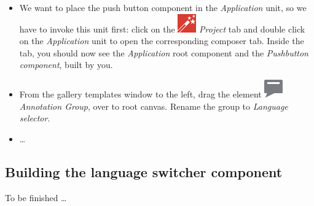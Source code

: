 \documentclass[
  a4paper,
,tablecaptionabove
]{scrbook}
\begin{document}
\begin{itemize}
\item
  We want to place the push button component in the \emph{Application}
  unit, so we have to invoke this unit first: click on the
  \includegraphics{./../asciidoc/modules/ROOT/assets/images/icons/EmbeddedWizardIcon.png}
  \emph{Project} tab and double click on the \emph{Application} unit to
  open the corresponding composer tab. Inside the tab, you should now
  see the \emph{Application} root component and the \emph{Pushbutton
  component}, built by you.
\item
  From the gallery templates window to the left, drag the element
  \includegraphics{./../asciidoc/modules/ROOT/assets/images/icons/AnnotationGroupIcon.png}
  \emph{Annotation Group}, over to root canvas. Rename the group to
  \emph{Language selector}.
\item
  \ldots​
\end{itemize}

\hypertarget{_building_the_language_switcher_component}{%
\subsection{Building the language switcher
component}\label{_building_the_language_switcher_component}}

To be finished \ldots
\end{document}
